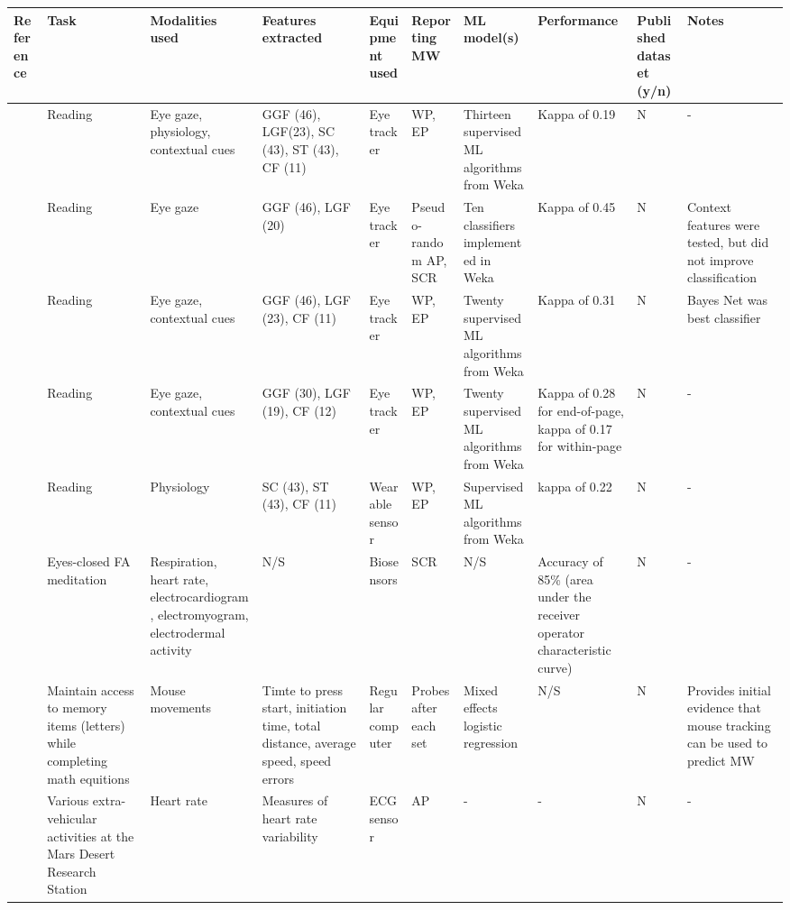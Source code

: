 \begin{landscape} %
\begin{xtabular}{p{25mm}p{28mm}p{30mm}p{22mm}p{38mm}p{22mm}p{23mm}p{22mm}p{15mm}p{3cm}}
  \toprule
  Reference & Task & Modalities used & Features extracted & Equipment used & Reporting MW & ML model(s) & Performance & Published dataset (y/n) & Notes \\
  \midrule
\cite{Bixler2015AutomaticPhysiology} & Reading & Eye gaze, physiology, contextual cues & GGF (46), LGF(23), SC (43), ST (43), CF (11) & Eye tracker & WP, EP & Thirteen supervised ML algorithms from Weka & Kappa of 0.19 & N & -\\ \midrule 
\cite{Bixler2015AutomaticAwareness} & Reading & Eye gaze & GGF (46), LGF (20) & Eye tracker & Pseudo-random AP, SCR & Ten classifiers implemented in Weka & Kappa of 0.45 & N & Context features were tested, but did not improve classification\\ \midrule 
\cite{Bixler2016AutomaticReading} & Reading & Eye gaze, contextual cues & GGF (46), LGF (23), CF (11) & Eye tracker & WP, EP & Twenty supervised ML algorithms from Weka & Kappa of 0.31 & N & Bayes Net was best classifier\\ \midrule
\cite{Bixler2014TowardWandering} & Reading & Eye gaze, contextual cues & GGF (30), LGF (19), CF (12) & Eye tracker & WP, EP & Twenty supervised ML algorithms from Weka & Kappa of 0.28 for end-of-page, kappa of 0.17 for within-page & N & -\\ \midrule 
\cite{Blanchard2014AutomatedLearning} & Reading & Physiology & SC (43), ST (43), CF (11) & Wearable sensor & WP, EP & Supervised ML algorithms from Weka & kappa of 0.22 & N & -\\ \midrule
\cite{Cheetham2016AutomatedApplication} & Eyes-closed FA meditation & Respiration, heart rate, electrocardiogram, electromyogram, electrodermal activity & N/S & Biosensors & SCR & N/S & Accuracy of 85\% (area under the receiver operator characteristic curve) & N & -\\\hline 
\cite{DaSilva2018WanderingWandering} & Maintain access to memory items (letters) while completing math equitions & Mouse movements & Timte to press start, initiation time, total distance, average speed, speed errors & Regular computer & Probes after each set & Mixed effects logistic regression & N/S & N & Provides initial evidence that mouse tracking can be used to predict MW\\\hline 
\cite{Gontier2016HowEnvironment} & Various extra-vehicular activities at the Mars Desert Research Station & Heart rate & Measures of heart rate variability & ECG sensor & AP & - & - & N & -\\ \midrule

\end{xtabular}
\end{landscape}
